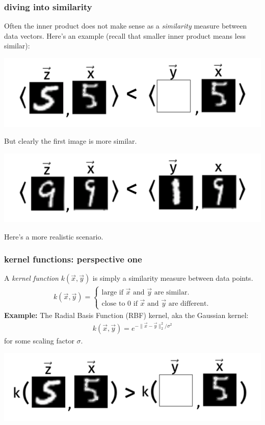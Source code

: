 \documentclass[handout,compress]{beamer}
\begin{document}
\begin{frame}
	\frametitle{diving into similarity}
	Often the inner product \alert{does not make sense} as a \emph{similarity} measure between data vectors. Here's an example (recall that smaller inner product means less similar):
	\begin{center}
		\includegraphics[width=.7\textwidth]{bad_inner_product.png}
		
		But clearly the first image is more similar. 
		
		
		\includegraphics[width=.7\textwidth]{better_inner_product.png}
		
		Here's a more realistic scenario.
	\end{center}
\end{frame}


\begin{frame} 
	\frametitle{kernel functions: perspective one}
	A \emph{kernel function} $k(\vec{x}, \vec{y})$ is simply a similarity measure between data points. 
	\begin{align*}
	k(\vec{x}, \vec{y}) = \begin{cases}
		\text{large if $\vec{x}$ and $\vec{y}$ are similar.}\\
		\text{close to $0$ if $\vec{x}$ and $\vec{y}$ are different.}
	\end{cases}
	\end{align*}
	\textbf{Example:} The Radial Basis Function (RBF) kernel, aka the Gaussian kernel:
	\begin{align*}
		k(\vec{x}, \vec{y}) = e^{-\|\vec{x} - \vec{y}\|_2^2/\sigma^2}
	\end{align*}
	for some scaling factor $\sigma$. 
	\begin{center}
	\includegraphics[width=.7\textwidth]{rbf_similarity.png}
	\end{center}
\end{frame}
\end{document}
